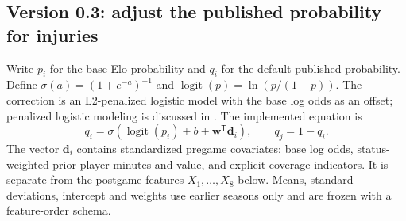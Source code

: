 \documentclass[11pt]{article}
\begin{document}
\subsection{Version 0.3: adjust the published probability for injuries}
Write $p_i$ for the base Elo probability and $q_i$ for the default published
probability. Define $\sigma(a)=(1+e^{-a})^{-1}$ and
$\operatorname{logit}(p)=\ln(p/(1-p))$. The correction is an L2-penalized logistic model with the base log odds
as an offset; penalized logistic modeling is discussed in
\cite[Sections 4.4 and 5.5]{esl}. The implemented equation is
\begin{equation}\label{eq:injury}
 \boxed{q_i=\sigma\!\left(\operatorname{logit}(p_i)+b+
 \mathbf w^{\mathsf T}\mathbf d_i\right)},\qquad q_j=1-q_i.
\end{equation}
The vector $\mathbf d_i$ contains standardized pregame covariates: base log
odds, status-weighted prior player minutes and value, and explicit coverage
indicators. It is separate from the postgame features $X_1,\ldots,X_8$ below.
Means, standard deviations, intercept and weights use earlier seasons only
and are frozen with a feature-order schema.
\end{document}
